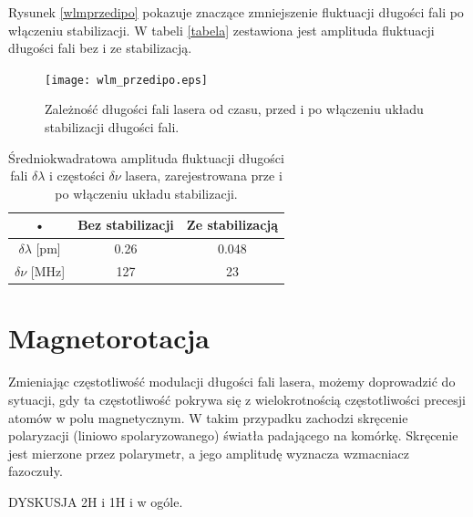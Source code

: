 \documentclass[a4paper,10pt,twoside]{report}
\begin{document}
Rysunek \ref{wlmprzedipo} pokazuje znaczące zmniejszenie fluktuacji długości fali po włączeniu stabilizacji. W tabeli \ref{tabela} zestawiona jest amplituda fluktuacji długości fali bez i ze stabilizacją. 



\begin{figure}[h!]
\centering
 \texttt{[image: wlm\_przedipo.eps]}
 \caption{Zależność długości fali lasera od czasu, przed i po włączeniu układu stabilizacji długości fali.}
 \label{fig:wlmprzedipo}
\end{figure}


\begin{table}[h!]
\centering
\begin{tabular}{|c|c|c|}
\hline 
• & Bez stabilizacji & Ze stabilizacją\\ 
\hline 
$\delta\lambda$ [pm]& 0.26 & 0.048 \\ 
\hline 
$\delta\nu$ [MHz]& 127 & 23 \\ 
\hline 
\end{tabular} 
\caption{Średniokwadratowa amplituda fluktuacji długości fali $\delta\lambda$ i częstości $\delta\nu$ lasera, zarejestrowana prze i po włączeniu układu stabilizacji. }
\end{table}

\section{Magnetorotacja}
\label{sec:magnetorotacja}


Zmieniając częstotliwość modulacji długości fali lasera, możemy doprowadzić do sytuacji, gdy ta częstotliwość pokrywa się z wielokrotnością częstotliwości precesji atomów w polu magnetycznym.
W takim przypadku zachodzi skręcenie polaryzacji (liniowo spolaryzowanego) światła padającego na komórkę. Skręcenie jest mierzone przez polarymetr, a jego amplitudę wyznacza wzmacniacz fazoczuły.

DYSKUSJA 2H i 1H i w ogóle.
\end{document}

